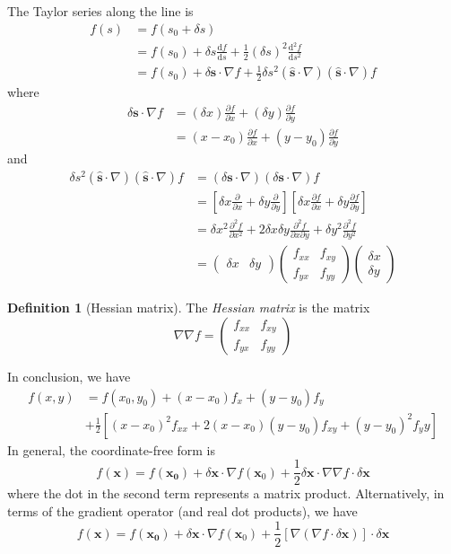 \documentclass[a4paper]{article}
\theoremstyle{definition}
\newtheorem*{defi}{Definition}
\newcommand{\mb}[1]{\mathbf{#1}}
\renewcommand{\d}{\mathrm{d}}
\begin{document}
The Taylor series along the line is
\begin{align*}
  f(s) &= f(s_0 + \delta s)\\
  &=f(s_0) + \delta s\frac{\d f}{\d s} + \frac{1}{2}(\delta s)^2\frac{\d ^2 f}{\d s^2}\\
  &= f(s_0) + \delta \mb{s} \cdot \nabla f + \frac{1}{2}\delta s^2 (\mb{\hat{s}}\cdot \nabla)(\mb{\hat{s}}\cdot \nabla)f
\end{align*}
where 
\begin{align*}
  \delta \mb{s}\cdot \nabla f &= (\delta x)\frac{\partial f}{\partial x} + (\delta y)\frac{\partial f}{\partial y}\\
  &= (x - x_0)\frac{\partial f}{\partial x} + (y - y_0)\frac{\partial f}{\partial y}
\end{align*}
and
\begin{align*}
  \delta s^2 (\mb{\hat{s}}\cdot \nabla)(\mb{\hat{s}}\cdot \nabla)f &= (\delta \mb{s}\cdot \nabla)(\delta \mb{s}\cdot \nabla) f\\
  &= \left[\delta x\frac{\partial }{\partial x} + \delta y\frac{\partial}{\partial y}\right]\left[\delta x\frac{\partial f}{\partial x} + \delta y\frac{\partial f}{\partial y}\right]\\
  &= \delta x^2 \frac{\partial^2 f}{\partial x^2} + 2\delta x\delta y\frac{\partial^2 f}{\partial x\partial y} + \delta y^2 \frac{\partial^2 f}{\partial y^2}\\
&= 
  \begin{pmatrix}
    \delta x& \delta y
  \end{pmatrix}
  \begin{pmatrix}
    f_{xx}&f_{xy}\\
    f_{yx}&f_{yy}
  \end{pmatrix}
  \begin{pmatrix}
    \delta x\\\delta y
  \end{pmatrix}
\end{align*}
\begin{defi}[Hessian matrix]
  The \emph{Hessian matrix} is the matrix
\[
\nabla \nabla f =
\begin{pmatrix}
  f_{xx}&f_{xy}\\
  f_{yx}&f_{yy}
\end{pmatrix}
\]
\end{defi}

In conclusion, we have
\begin{align*}
  f(x, y) &= f(x_0, y_0) + (x - x_0)f_x + (y - y_0)f_y \\
  &+ \frac{1}{2}[(x - x_0)^2 f_{xx} + 2(x - x_0)(y - y_0)f_{xy} + (y - y_0)^2 f_yy]
\end{align*}
In general, the coordinate-free form is
\[
f(\mb{x}) = f(\mb{x_0}) + \delta \mb{x}\cdot\nabla f(\mb{x}_0) + \frac{1}{2}\delta \mb{x}\cdot \nabla \nabla f\cdot \delta \mb{x}
\]
where the dot in the second term represents a matrix product. Alternatively, in terms of the gradient operator (and real dot products), we have
\[
f(\mb{x}) = f(\mb{x_0}) + \delta \mb{x}\cdot \nabla f(\mb{x}_0) + \frac{1}{2}[\nabla (\nabla f\cdot \delta \mb{x})]\cdot \delta\mb{x}
\]
\end{document}
